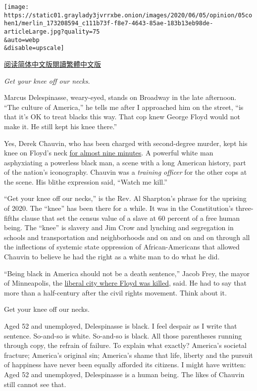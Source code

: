 \texttt{[image: https://static01.graylady3jvrrxbe.onion/images/2020/06/05/opinion/05cohen1/merlin\_173208594\_c111b73f-f8e7-4643-85ae-183b13eb98de-articleLarge.jpg?quality=75\\\&auto=webp\\\&disable=upscale]}

\href{https://cn.nytimes3xbfgragh.onion/opinion/20200610/george-floyd-protests/}{阅读简体中文版}\href{https://cn.nytimes3xbfgragh.onion/opinion/20200610/george-floyd-protests/zh-hant/}{閱讀繁體中文版}

\emph{Get your knee off our necks.}

Marcus Delespinasse, weary-eyed, stands on Broadway in the late
afternoon. ``The culture of America,'' he tells me after I approached
him on the street, ``is that it's OK to treat blacks this way. That cop
knew George Floyd would not make it. He still kept his knee there.''

Yes, Derek Chauvin, who has been charged with second-degree murder, kept
his knee on Floyd's neck
\href{https://www.nytimes3xbfgragh.onion/2020/05/31/us/george-floyd-investigation.html}{for
almost nine minutes}. A powerful white man asphyxiating a powerless
black man, a scene with a long American history, part of the nation's
iconography. Chauvin was a \emph{training officer} for the other cops at
the scene. His blithe expression said, ``Watch me kill.''

``Get your knee off our necks,'' is the Rev. Al Sharpton's phrase for
the uprising of 2020. The ``knee'' has been there for a while. It was in
the Constitution's three-fifths clause that set the census value of a
slave at 60 percent of a free human being. The ``knee'' is slavery and
Jim Crow and lynching and segregation in schools and transportation and
neighborhoods and on and on and on through all the inflections of
systemic state oppression of African-Americans that allowed Chauvin to
believe he had the right as a white man to do what he did.

``Being black in America should not be a death sentence,'' Jacob Frey,
the mayor of Minneapolis, the
\href{https://www.nytimes3xbfgragh.onion/2020/06/01/us/minneapolis-racism-minnesota.html}{liberal
city where Floyd was killed}, said. He had to say that more than a
half-century after the civil rights movement. Think about it.

Get your knee off our necks.

Aged 52 and unemployed, Delespinasse is black. I feel despair as I write
that sentence. So-and-so is white. So-and-so is black. All those
parentheses running through copy, the refrain of failure. To explain
what exactly? America's societal fracture; America's original sin;
America's shame that life, liberty and the pursuit of happiness have
never been equally afforded its citizens. I might have written: Aged 52
and unemployed, Delespinasse is a human being. The likes of Chauvin
still cannot see that.

